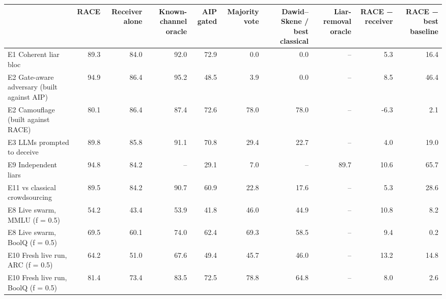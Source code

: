 \begin{tabular}{lrrrrrrrrr}
\toprule
 & RACE & Receiver alone & Known-channel oracle & AIP gated & Majority vote & Dawid–Skene / best classical & Liar-removal oracle & RACE − receiver & RACE − best baseline \\
\midrule
E1  Coherent liar bloc & 89.3 & 84.0 & 92.0 & 72.9 & 0.0 & 0.0 & -- & 5.3 & 16.4 \\
E2  Gate-aware adversary (built against AIP) & 94.9 & 86.4 & 95.2 & 48.5 & 3.9 & 0.0 & -- & 8.5 & 46.4 \\
E2  Camouflage (built against RACE) & 80.1 & 86.4 & 87.4 & 72.6 & 78.0 & 78.0 & -- & -6.3 & 2.1 \\
E3  LLMs prompted to deceive & 89.8 & 85.8 & 91.1 & 70.8 & 29.4 & 22.7 & -- & 4.0 & 19.0 \\
E9  Independent liars & 94.8 & 84.2 & -- & 29.1 & 7.0 & -- & 89.7 & 10.6 & 65.7 \\
E11 vs classical crowdsourcing & 89.5 & 84.2 & 90.7 & 60.9 & 22.8 & 17.6 & -- & 5.3 & 28.6 \\
E8  Live swarm, MMLU (f = 0.5) & 54.2 & 43.4 & 53.9 & 41.8 & 46.0 & 44.9 & -- & 10.8 & 8.2 \\
E8  Live swarm, BoolQ (f = 0.5) & 69.5 & 60.1 & 74.0 & 62.4 & 69.3 & 58.5 & -- & 9.4 & 0.2 \\
E10 Fresh live run, ARC (f = 0.5) & 64.2 & 51.0 & 67.6 & 49.4 & 45.7 & 46.0 & -- & 13.2 & 14.8 \\
E10 Fresh live run, BoolQ (f = 0.5) & 81.4 & 73.4 & 83.5 & 72.5 & 78.8 & 64.8 & -- & 8.0 & 2.6 \\
\bottomrule
\end{tabular}
